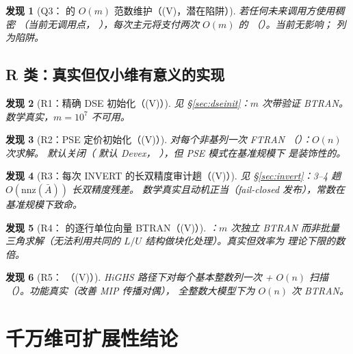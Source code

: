 \documentclass[11pt]{ctexart}
\newtheorem{finding}{发现}
\newcommand{\nnz}{\mathrm{nnz}}
\begin{document}
\begin{finding}[Q3： 的 $O(m)$ 范数维护（(V)，潜在陷阱）]
若任何未来调用方使用稠密 （当前无调用点，
），每次主元将支付两次 $O(m)$ 的
（）。当前无影响；
列为陷阱。
\end{finding}

\subsection{R 类：真实但仅小维有意义的实现}

\begin{finding}[R1：精确 DSE 初始化（(V)）]
见 \S\ref{sec:dseinit}：$m$ 次带验证 BTRAN。数学真实，$m=10^{7}$
不可用。
\end{finding}

\begin{finding}[R2：PSE 定价初始化（(V)）]
 对每个非基列一次 FTRAN
（）：$O(n)$ 次求解。
默认关闭（ 默认 Devex，
），但 PSE 模式在基准规模下
是装饰性的。
\end{finding}

\begin{finding}[R3：每次 INVERT 的长双精度审计趟（(V)）]
见 \S\ref{sec:invert}：3--4 趟 $O(\nnz(\bar A))$ 长双精度残差。
数学真实且动机正当（fail-closed 发布），常数在基准规模下致命。
\end{finding}

\begin{finding}[R4： 的逐行单位向量
BTRAN（(V)）]
：$m$ 次独立 BTRAN 而非批量
三角求解（无法利用共同的 $L/U$ 结构做块化处理）。真实但效率为
理论下限的数倍。
\end{finding}

\begin{finding}[R5：
（(V)）]
HiGHS 路径下对每个基本整数列一次  + $O(n)$ 扫描
（）。功能真实（改善 MIP 传播对偶），
全整数大模型下为 $O(n)$ 次 BTRAN。
\end{finding}

\section{千万维可扩展性结论}
\label{sec:scale}
\end{document}
